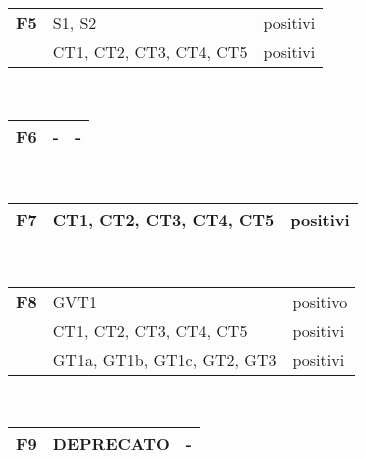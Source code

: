  \begin{center}
\begin{tabular}{|p{2cm}|p{7cm}|p{2cm}|} \hline
\textbf{F5}  & S1, S2 & positivi\\ \cline{2-3}
& CT1, CT2, CT3, CT4, CT5 & positivi\\ \hline
\end{tabular} \\
\end{center}

 \begin{center}
\begin{tabular}{|p{2cm}|p{7cm}|p{2cm}|} \hline
\textbf{F6}  &  - & -\\ \hline
\end{tabular} \\
\end{center}

 \begin{center}
\begin{tabular}{|p{2cm}|p{7cm}|p{2cm}|} \hline
\textbf{F7}  & CT1, CT2, CT3, CT4, CT5 & positivi \\ \hline
\end{tabular} \\
\end{center}

 \begin{center}
\begin{tabular}{|p{2cm}|p{7cm}|p{2cm}|} \hline
\textbf{F8}  & GVT1 & positivo\\ \cline{2-3}
&  CT1, CT2, CT3, CT4, CT5 & positivi\\ \cline{2-3}
&  GT1a, GT1b, GT1c, GT2, GT3 & positivi \\ \hline
\end{tabular} \\
\end{center}

 \begin{center}
\begin{tabular}{|p{2cm}|p{7cm}|p{2cm}|} \hline
\textbf{F9}  &  DEPRECATO & -\\ \hline
\end{tabular} \\
\end{center}

